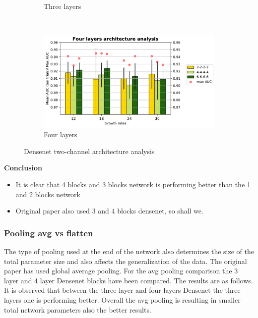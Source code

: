 \begin{figure}
\begin{subfigure}[b]{0.4\textwidth}
        \caption{Three layers }
        \label{fig:densenet_simple_three_layer_bar}
    \end{subfigure}
    ~ %
    \begin{subfigure}[b]{0.4\textwidth}
        \includegraphics[width=\textwidth]{images/densenet/simple/densenet_simple_four_layer_bar}
        \caption{Four layers}
       \label{fig:densenet_simple_four_layer_bar}
    \end{subfigure} 
    \caption{Densenet two-channel architecture analysis}
    \label{fig:dense_arch_1}
\end{figure}  

\textbf{Conclusion}
\begin{itemize}
 \item It is clear that 4 blocks and 3 blocks network is performing better than the 1 and 2 blocks network
 \item Original paper also used 3 and 4 blocks densenet, so shall we.
\end{itemize}

\subsubsection{Pooling avg vs flatten}
The type of pooling used at the end of the network also determines the size of the total parameter size and also affects the generalization of the data. The original paper has used global average pooling. 
For the avg pooling comparison the 3 layer and 4 layer Densenet blocks have been compared. The results are as follows. It is observed that between the three layer and four layers Densenet the three layers
one is performing better. Overall the avg pooling is resulting in smaller total network parameters also the better results.

